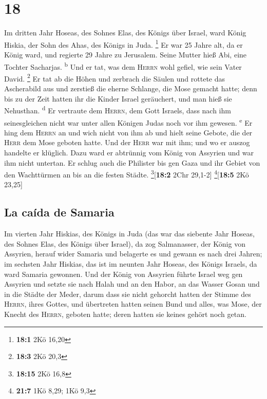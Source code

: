 \hypertarget{section-17}{%
\section{18}\label{section-17}}

 Im dritten Jahr Hoseas, des Sohnes Elas, des Königs über
Israel, ward König Hiskia, der Sohn des Ahas, des Königs in Juda.
\footnote{\textbf{18:1} 2Kö 16,20}  Er war 25 Jahre alt,
da er König ward, und regierte 29 Jahre zu Jerusalem. Seine Mutter hieß
Abi, eine Tochter Sacharjas. \textsuperscript{b}  Und er
tat, was dem \textsc{Herrn} wohl gefiel, wie sein Vater David.
\footnote{\textbf{18:3} 2Kö 20,3}  Er tat ab die Höhen und
zerbrach die Säulen und rottete das Ascherabild aus und zerstieß die
eherne Schlange, die Mose gemacht hatte; denn bis zu der Zeit hatten ihr
die Kinder Israel geräuchert, und man hieß sie Nehusthan.
\textsuperscript{d}  Er vertraute dem \textsc{Herrn}, dem
Gott Israels, dass nach ihm seinesgleichen nicht war unter allen Königen
Judas noch vor ihm gewesen. \textsuperscript{e}  Er hing
dem \textsc{Herrn} an und wich nicht von ihm ab und hielt seine Gebote,
die der \textsc{Herr} dem Mose geboten hatte.  Und der
\textsc{Herr} war mit ihm; und wo er auszog handelte er klüglich. Dazu
ward er abtrünnig vom König von Assyrien und war ihm nicht untertan.
 Er schlug auch die Philister bis gen Gaza und ihr Gebiet
von den Wachttürmen an bis an die festen Städte.
\footnote{\textbf{18:15} 2Kö 16,8}{[}\textbf{18:2} 2Chr 29,1-2{]}
\footnote{\textbf{21:7} 1Kö 8,29; 1Kö 9,3}{[}\textbf{18:5} 2Kö 23,25{]}

\hypertarget{la-cauxedda-de-samaria}{%
\subsection{La caída de Samaria}\label{la-cauxedda-de-samaria}}

 Im vierten Jahr Hiskias, des Königs in Juda (das war das
siebente Jahr Hoseas, des Sohnes Elas, des Königs über Israel), da zog
Salmanasser, der König von Assyrien, herauf wider Samaria und belagerte
es  und gewann es nach drei Jahren; im sechsten Jahr
Hiskias, das ist im neunten Jahr Hoseas, des Königs Israels, da ward
Samaria gewonnen.  Und der König von Assyrien führte
Israel weg gen Assyrien und setzte sie nach Halah und an den Habor, an
das Wasser Gosan und in die Städte der Meder,  darum dass
sie nicht gehorcht hatten der Stimme des \textsc{Herrn}, ihres Gottes,
und übertreten hatten seinen Bund und alles, was Mose, der Knecht des
\textsc{Herrn}, geboten hatte; deren hatten sie keines gehört noch
getan.

